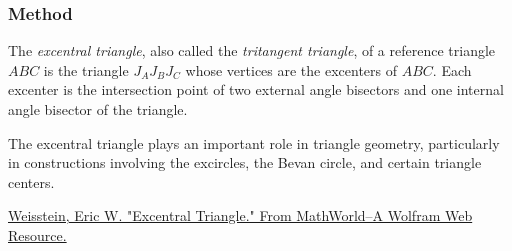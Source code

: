 \vspace{1em}
\begin{minipage}{.5\textwidth}
\begin{center}
\end{center}
\end{minipage}
\begin{minipage}{.5\textwidth}
\begin{tkzexample}
\end{tkzexample}
\end{minipage}

\subsubsection{Method }
\label{ssub:method_triangle_excentral}

The \emph{excentral triangle}, also called the \emph{tritangent triangle}, of a reference triangle $ABC$ is the triangle $J_AJ_BJ_C$ whose vertices are the excenters of $ABC$. Each excenter is the intersection point of two external angle bisectors and one internal angle bisector of the triangle.

The excentral triangle plays an important role in triangle geometry, particularly in constructions involving the excircles, the Bevan circle, and certain triangle centers.
\begin{flushright}
\small
\href{https://mathworld.wolfram.com/ExcentralTriangle.html}{Weisstein, Eric W. "Excentral Triangle." From MathWorld--A Wolfram Web Resource.}
\end{flushright}

